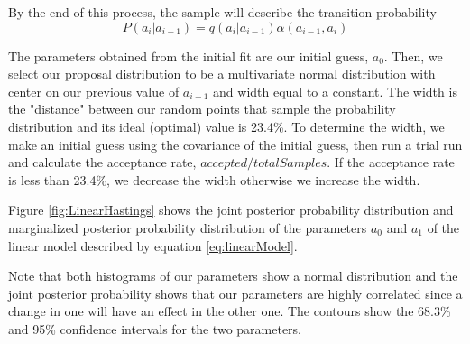 By the end of this process, the sample will describe the transition probability 
\begin{equation}
    P(a_{i}|a_{i-1})=q(a_{i}|a_{i-1})\alpha(a_{i-1},a_i)
\end{equation}

The parameters obtained from the initial fit are our initial guess, $a_0$. 
Then, we select our proposal distribution to be a multivariate normal distribution with center on our previous value of $a_{i-1}$ and width equal to a constant.
The width is the "distance" between our random points that sample the probability distribution and its ideal (optimal) value is 23.4\%.
To determine the width, we make an initial guess using the covariance of the initial guess, then run a trial run and calculate the acceptance rate, $accepted/totalSamples$.
If the acceptance rate is less than 23.4\%, we decrease the width otherwise we increase the width. 

Figure \ref{fig:LinearHastings} shows the joint posterior probability distribution and marginalized posterior probability distribution of the parameters $a_0$ and $a_1$ of the linear model described by equation \ref{eq:linearModel}. 

Note that both histograms of our parameters show a normal distribution and the joint posterior probability shows that our parameters are highly correlated since a change in one will have an effect in the other one. The contours show the 68.3\% and 95\% confidence intervals for the two parameters.


